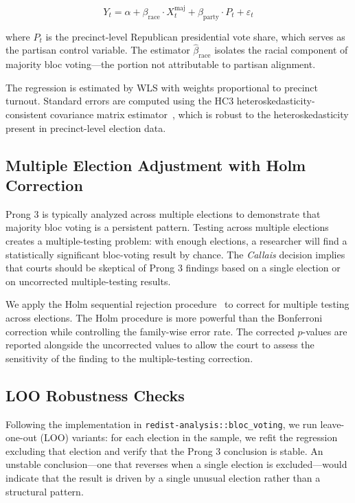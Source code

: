 \begin{equation}
  Y_t = \alpha + \beta_{\text{race}} \cdot X^{\text{maj}}_t
                + \beta_{\text{party}} \cdot P_t
                + \varepsilon_t
  \label{eq:prong3-main}
\end{equation}

where $P_t$ is the precinct-level Republican presidential vote share, which
serves as the partisan control variable.  The estimator $\hat{\beta}_{\text{race}}$
isolates the racial component of majority bloc voting---the portion not
attributable to partisan alignment.

The regression is estimated by WLS with weights proportional to precinct
turnout.  Standard errors are computed using the HC3 heteroskedasticity-consistent
covariance matrix estimator~\citep{mackinnon1985some}, which is robust to
the heteroskedasticity present in precinct-level election data.

\subsection{Multiple Election Adjustment with Holm Correction}

Prong 3 is typically analyzed across multiple elections to demonstrate that
majority bloc voting is a persistent pattern.  Testing across multiple
elections creates a multiple-testing problem: with enough elections, a
researcher will find a statistically significant bloc-voting result by chance.
The \textit{Callais} decision implies that courts should be skeptical of
Prong 3 findings based on a single election or on uncorrected multiple-testing
results.

We apply the Holm sequential rejection procedure~\citep{holm1979simple} to
correct for multiple testing across elections.  The Holm procedure is more
powerful than the Bonferroni correction while controlling the family-wise
error rate.  The corrected $p$-values are reported alongside the uncorrected
values to allow the court to assess the sensitivity of the finding to the
multiple-testing correction.

\subsection{LOO Robustness Checks}

Following the implementation in \texttt{redist-analysis::bloc\_voting}, we
run leave-one-out (LOO) variants: for each election in the sample, we refit
the regression excluding that election and verify that the Prong 3 conclusion
is stable.  An unstable conclusion---one that reverses when a single election
is excluded---would indicate that the result is driven by a single unusual
election rather than a structural pattern.

